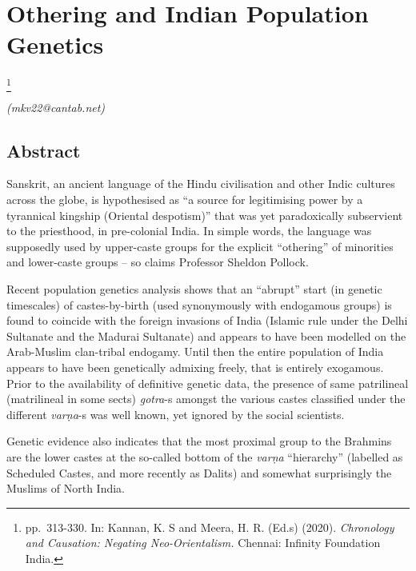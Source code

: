 
\chapter{\hspace{7.32cm} \hfill Othering \break and Indian Population Genetics}\label{chapter10}

\footnote{pp.~313-330. In: Kannan, K. S and Meera, H. R. (Ed.s) (2020). \textit{Chronology and Causation: Negating Neo-Orientalism.} Chennai: Infinity Foundation India.}


\begin{flushright}
\textit{(mkv22@cantab.net)}
\end{flushright}

\setcounter{endnote}{0}

\section*{Abstract}

Sanskrit, an ancient language of the Hindu civilisation and other Indic cultures across the globe, is hypothesised as “a source for legitimising power by a tyrannical kingship (Oriental despotism)” that was yet paradoxically subservient to the priesthood, in pre-colonial India. In simple words, the language was supposedly used by upper-caste groups for the explicit “othering” of minorities and lower-caste groups – so claims Professor Sheldon Pollock.

Recent population genetics analysis shows that an “abrupt” start (in genetic timescales) of castes-by-birth (used synonymously with endogamous groups) is found to coincide with the foreign invasions of India (Islamic rule under the Delhi Sultanate and the Madurai Sultanate) and appears to have been modelled on the Arab-Muslim clan-tribal endogamy. Until then the entire population of India appears to have been genetically admixing freely, that is entirely exogamous. Prior to the availability of definitive genetic data, the presence of same patrilineal (matrilineal in some sects) \textit{gotra}-s amongst the various castes classified under the different \textit{varṇa}-s was well known, yet ignored by the social scientists.

Genetic evidence also indicates that the most proximal group to the Brahmins are the lower castes at the so-called bottom of the \textit{varṇa} “hierarchy” (labelled as Scheduled Castes, and more recently as Dalits) and somewhat surprisingly the Muslims of North India.

